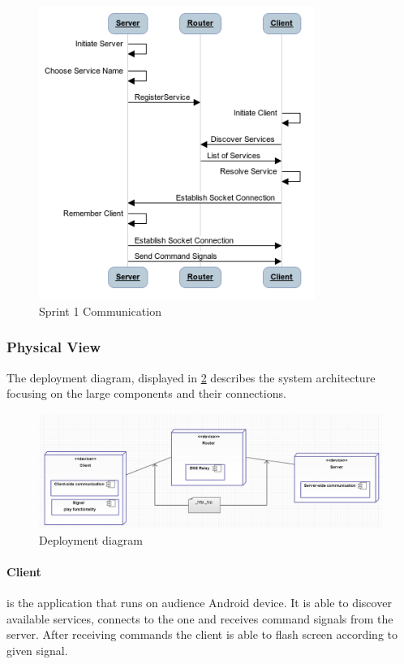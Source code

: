 \begin{figure}[H]
	\centering
		\includegraphics[width=9cm]{sprint1/communication.png}
	\caption{Sprint 1 Communication}
	\label{fig:sprint1_communication}
\end{figure}

\subsubsection{Physical View}
The deployment diagram, displayed in \ref{fig:deployment_diagram } describes the system architecture focusing on the large components and their connections.

\begin{figure}[H]
	\centering
		\includegraphics[width=15cm]{sprint1/deploy_diagram.png}
	\caption{Deployment diagram}
	\label{fig:deployment_diagram }
\end{figure}

\paragraph{Client}
is the application that runs on audience Android device. It is able to discover available services, connects to the one and receives command signals from the server. After receiving commands the client is able to flash screen according to given signal.

